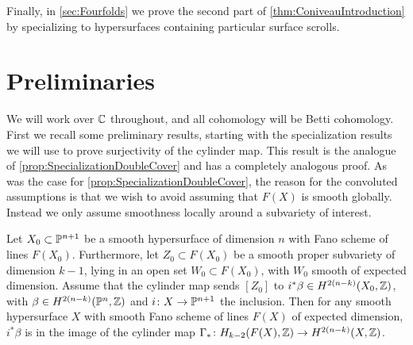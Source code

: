 Finally, in \cref{sec:Fourfolds} we prove the second part of \cref{thm:ConiveauIntroduction} by specializing to hypersurfaces containing particular surface scrolls.

\section{Preliminaries}
We will work over $\C$ throughout, and all cohomology will be Betti cohomology. First we recall some preliminary results, starting with the specialization results we will use to prove surjectivity of the cylinder map. 
This result is the analogue of \cref{prop:SpecializationDoubleCover} and has a completely analogous proof. As was the case for \cref{prop:SpecializationDoubleCover}, the reason for the convoluted assumptions is that we wish to avoid assuming that $F(X)$ is smooth globally. Instead we only assume smoothness locally around a subvariety of interest.
\begin{lemma}
	\label{prop:SpecializationHypersurface}
	Let $X_0 \subset \P^{n+1}$ be a smooth hypersurface of dimension $n$ with Fano scheme of lines $F(X_0)$. Furthermore, let $Z_0 \subset F(X_0)$ be a smooth proper subvariety of dimension $k-1$, lying in an open set $W_0 \subset F(X_0)$, with $W_0$ smooth of expected dimension. Assume that the cylinder map sends $[Z_0]$ to $i^*\beta \in H^{2(n-k)}(X_0,\Z)$, with $\beta \in H^{2(n-k)}(\P^n,\Z)$ and $i \from X \to \P^{n+1}$ the inclusion. Then for any smooth hypersurface $X$ with smooth Fano scheme of lines $F(X)$ of expected dimension, $i^*\beta$ is in the image of the cylinder map $\Gamma_* \from H_{k-2}(F(X),\Z) \to H^{2(n-k)}(X,\Z)$.
\end{lemma}
